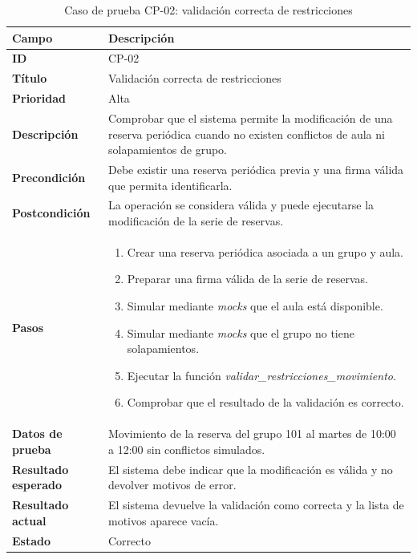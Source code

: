\begin{table}[H]
	\centering
	\small
	\renewcommand{\arraystretch}{1.2}
	\begin{tabularx}{\textwidth}{@{}p{3.5cm}X@{}}
		\toprule
		\textbf{Campo} & \textbf{Descripción} \\
		\midrule
		\textbf{ID} & CP-02 \\
		\textbf{Título} & Validación correcta de restricciones \\
		\textbf{Prioridad} & Alta \\
		\textbf{Descripción} & Comprobar que el sistema permite la modificación de una reserva periódica cuando no existen conflictos de aula ni solapamientos de grupo. \\
		\textbf{Precondición} & Debe existir una reserva periódica previa y una firma válida que permita identificarla. \\
		\textbf{Postcondición} & La operación se considera válida y puede ejecutarse la modificación de la serie de reservas. \\
		\textbf{Pasos} &
		\begin{enumerate}
			\item Crear una reserva periódica asociada a un grupo y aula.
			\item Preparar una firma válida de la serie de reservas.
			\item Simular mediante \textit{mocks} que el aula está disponible.
			\item Simular mediante \textit{mocks} que el grupo no tiene solapamientos.
			\item Ejecutar la función \textit{validar\_restricciones\_movimiento}.
			\item Comprobar que el resultado de la validación es correcto.
		\end{enumerate} \\
		\textbf{Datos de prueba} & Movimiento de la reserva del grupo 101 al martes de 10:00 a 12:00 sin conflictos simulados. \\
		\textbf{Resultado esperado} & El sistema debe indicar que la modificación es válida y no devolver motivos de error. \\
		\textbf{Resultado actual} & El sistema devuelve la validación como correcta y la lista de motivos aparece vacía. \\
		\textbf{Estado} & Correcto \\
		\bottomrule
	\end{tabularx}
	\caption{Caso de prueba CP-02: validación correcta de restricciones}
	\label{tab}
\end{table}

